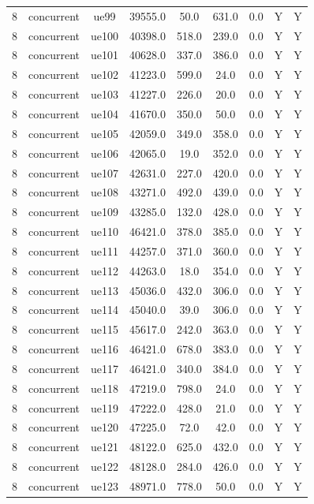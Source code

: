 \begin{table}[ht]
\begin{tabular}{|c|c|c|c|c|c|c|c|c|}
8 & concurrent & ue99 & 39555.0 & 50.0 & 631.0 & 0.0 & Y & Y \\
8 & concurrent & ue100 & 40398.0 & 518.0 & 239.0 & 0.0 & Y & Y \\
8 & concurrent & ue101 & 40628.0 & 337.0 & 386.0 & 0.0 & Y & Y \\
8 & concurrent & ue102 & 41223.0 & 599.0 & 24.0 & 0.0 & Y & Y \\
8 & concurrent & ue103 & 41227.0 & 226.0 & 20.0 & 0.0 & Y & Y \\
8 & concurrent & ue104 & 41670.0 & 350.0 & 50.0 & 0.0 & Y & Y \\
8 & concurrent & ue105 & 42059.0 & 349.0 & 358.0 & 0.0 & Y & Y \\
8 & concurrent & ue106 & 42065.0 & 19.0 & 352.0 & 0.0 & Y & Y \\
8 & concurrent & ue107 & 42631.0 & 227.0 & 420.0 & 0.0 & Y & Y \\
8 & concurrent & ue108 & 43271.0 & 492.0 & 439.0 & 0.0 & Y & Y \\
8 & concurrent & ue109 & 43285.0 & 132.0 & 428.0 & 0.0 & Y & Y \\
8 & concurrent & ue110 & 46421.0 & 378.0 & 385.0 & 0.0 & Y & Y \\
8 & concurrent & ue111 & 44257.0 & 371.0 & 360.0 & 0.0 & Y & Y \\
8 & concurrent & ue112 & 44263.0 & 18.0 & 354.0 & 0.0 & Y & Y \\
8 & concurrent & ue113 & 45036.0 & 432.0 & 306.0 & 0.0 & Y & Y \\
8 & concurrent & ue114 & 45040.0 & 39.0 & 306.0 & 0.0 & Y & Y \\
8 & concurrent & ue115 & 45617.0 & 242.0 & 363.0 & 0.0 & Y & Y \\
8 & concurrent & ue116 & 46421.0 & 678.0 & 383.0 & 0.0 & Y & Y \\
8 & concurrent & ue117 & 46421.0 & 340.0 & 384.0 & 0.0 & Y & Y \\
8 & concurrent & ue118 & 47219.0 & 798.0 & 24.0 & 0.0 & Y & Y \\
8 & concurrent & ue119 & 47222.0 & 428.0 & 21.0 & 0.0 & Y & Y \\
8 & concurrent & ue120 & 47225.0 & 72.0 & 42.0 & 0.0 & Y & Y \\
8 & concurrent & ue121 & 48122.0 & 625.0 & 432.0 & 0.0 & Y & Y \\
8 & concurrent & ue122 & 48128.0 & 284.0 & 426.0 & 0.0 & Y & Y \\
8 & concurrent & ue123 & 48971.0 & 778.0 & 50.0 & 0.0 & Y & Y \\

\end{tabular}
\end{table}
